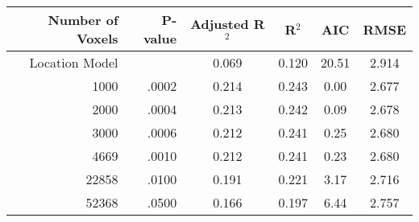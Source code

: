 \begin{table}[H]
\centering
\begin{tabular}{rr|cccc}
  \hline
{\bf Number of Voxels} & {\bf P-value} & {\bf Adjusted R$^2$} & {\bf R$^2$} & {\bf AIC} & {\bf RMSE} \\ 
  \hline
Location Model &  & 0.069 & 0.120 & 20.51 & 2.914 \\ 
  1000 & .0002 & 0.214 & 0.243 & 0.00 & 2.677 \\ 
  2000 & .0004 & 0.213 & 0.242 & 0.09 & 2.678 \\ 
  3000 & .0006 & 0.212 & 0.241 & 0.25 & 2.680 \\ 
  4669 & .0010 & 0.212 & 0.241 & 0.23 & 2.680 \\ 
  22858 & .0100 & 0.191 & 0.221 & 3.17 & 2.716 \\ 
  52368 & .0500 & 0.166 & 0.197 & 6.44 & 2.757 \\ 
   \hline
\end{tabular}
\label{t:gcs}
\end{table}
